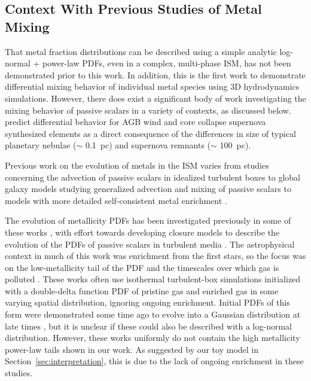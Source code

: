 \documentclass[twocolumn]{aastex61}
\begin{document}
\subsection{Context With Previous Studies of Metal Mixing}
\label{sec:context}
That metal fraction distributions can be described using a simple analytic log-normal + power-law PDFs, even in a complex, multi-phase ISM, has not been demonstrated prior to this work.   In addition, this is the first work to demonstrate differential mixing behavior of individual metal species using 3D hydrodynamics simulations. However, there does exist a significant body of work investigating the mixing behavior of passive scalars in a variety of contexts, as discussed below. \cite{KrumholzTing2018} predict differential behavior for AGB wind and core collapse supernova synthesized elements as a direct consequence of the differences in size of typical planetary nebulae ($\sim$ 0.1~pc) and supernova remnants ($\sim$ 100~pc).

Previous work on the evolution of metals in the ISM varies from studies concerning the advection of passive scalars in idealized turbulent boxes \citep[e.g.][]{Pope1991, PanScannapieco2010, PanScannapiecoScalo2012, PanScannapiecoScalo2013, YangKrumholz2012, SurPanScannapieco2014, Colbrook2017}
to global galaxy models studying generalized advection and mixing of passive scalars \citep[e.g.][]{deAvillez2002,Petit2015,Goldbaum2016} to models with more detailed self-consistent metal enrichment \citep[e.g.][]{Revaz2009,Escala2018}.


The evolution of metallicity PDFs has been investigated previously in some of these works \citep[see ][ and references therein]{PanScannapiecoScalo2012,PanScannapiecoScalo2013}, with effort towards developing closure models to describe the evolution of the PDFs of passive scalars in turbulent media \citep[e.g.][]{EswaranPope1988,Chen1989,Pope1991}. The astrophysical context in much of this work was enrichment from the first stars, so the focus was on the low-metallicity tail of the PDF and the timescales over which gas is polluted \citep[e.g.][]{PanScannapiecoScalo2013,Sarmento2017}. These works often use isothermal turbulent-box simulations initialized with a double-delta function PDF of pristine gas and enriched gas in some varying spatial distribution, ignoring ongoing enrichment. Initial PDFs of this form were demonstrated some time ago to evolve into a Gaussian distribution at late times \citep{EswaranPope1988}, but it is unclear if these could also be described with a log-normal distribution. However, these works uniformly do not contain the high metallicity power-law tails shown in our work. As suggested by our toy model in Section~\ref{sec:interpretation}, this is due to the lack of ongoing enrichment in these studies.
\end{document}
